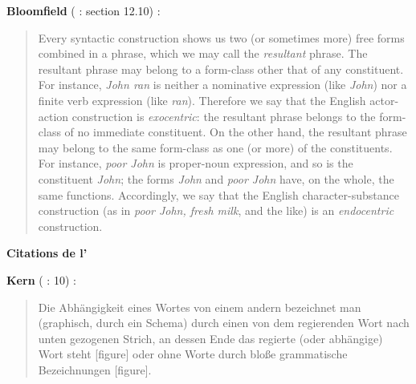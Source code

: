 {    \textbf{Bloomfield} (\citeyear{bloomfield1933language} : section 12.10) :

    \begin{quote}

    Every syntactic construction shows us two (or sometimes more) free forms combined in a phrase, which we may call the \textit{resultant} phrase. The resultant phrase may belong to a form-class other that of any constituent. For instance, \textit{John ran} is neither a nominative expression (like \textit{John}) nor a finite verb expression (like \textit{ran}). Therefore we say that the English actor-action construction is \textit{exocentric}: the resultant phrase belongs to the form-class of no immediate constituent. On the other hand, the resultant phrase may belong to the same form-class as one (or more) of the constituents. For instance, \textit{poor John} is proper-noun expression, and so is the constituent \textit{John}; the forms \textit{John} and \textit{poor John} have, on the whole, the same functions. Accordingly, we say that the English character-substance construction (as in \textit{poor John, fresh milk}, and the like) is an \textit{endocentric} construction.
    \end{quote}

    {\bfseries
    Citations de l'
    }

    \textbf{Kern} (\citeyear{kern1883zur} : 10) :

    \begin{quote}

    Die Abhängigkeit eines Wortes von einem andern bezeichnet man (graphisch, durch ein Schema) durch einen von dem regierenden Wort nach unten gezogenen Strich, an dessen Ende das regierte (oder abhängige) Wort steht [figure] oder ohne Worte durch bloße grammatische Bezeichnungen [figure].
    \end{quote}
}
